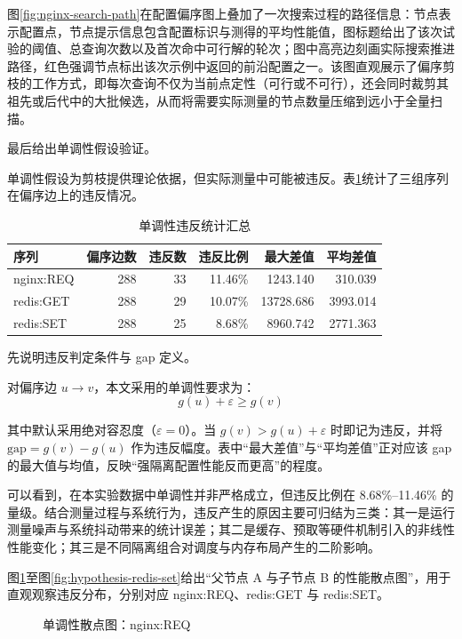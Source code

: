 \documentclass[UTF8,a4paper,12pt]{ctexart}
\numberwithin{equation}{section}
\begin{document}
图\ref{fig:nginx-search-path}在配置偏序图上叠加了一次搜索过程的路径信息：节点表示配置点，节点提示信息包含配置标识与测得的平均性能值，图标题给出了该次试验的阈值、总查询次数以及首次命中可行解的轮次；图中高亮边刻画实际搜索推进路径，红色强调节点标出该次示例中返回的前沿配置之一。该图直观展示了偏序剪枝的工作方式，即每次查询不仅为当前点定性（可行或不可行），还会同时裁剪其祖先或后代中的大批候选，从而将需要实际测量的节点数量压缩到远小于全量扫描。

最后给出单调性假设验证。

单调性假设为剪枝提供理论依据，但实际测量中可能被违反。表\ref{tab:monotonic-violation-summary}统计了三组序列在偏序边上的违反情况。

{\small
\setlength{\tabcolsep}{4pt}
\begin{longtable}{@{}lrrrrr@{}}
\caption{单调性违反统计汇总}\label{tab:monotonic-violation-summary}\\
\toprule
序列 & 偏序边数 & 违反数 & 违反比例 & 最大差值 & 平均差值 \\
\midrule
\endhead
\bottomrule
\endlastfoot
nginx:REQ & 288 & 33 & 11.46\% & 1243.140 & 310.039 \\
redis:GET & 288 & 29 & 10.07\% & 13728.686 & 3993.014 \\
redis:SET & 288 & 25 & 8.68\% & 8960.742 & 2771.363 \\
\end{longtable}
}

先说明违反判定条件与 gap 定义。

对偏序边 \(u\to v\)，本文采用的单调性要求为：
\begin{equation}
g(u) + \varepsilon \ge g(v)
\end{equation}

其中默认采用绝对容忍度（\(\varepsilon=0\)）。当
\(g(v) > g(u)+\varepsilon\) 时即记为违反，并将 \(\text{gap}=g(v)-g(u)\)
作为违反幅度。表中``最大差值''与``平均差值''正对应该 gap
的最大值与均值，反映``强隔离配置性能反而更高''的程度。

可以看到，在本实验数据中单调性并非严格成立，但违反比例在 8.68\%--11.46\%
的量级。结合测量过程与系统行为，违反产生的原因主要可归结为三类：其一是运行测量噪声与系统抖动带来的统计误差；其二是缓存、预取等硬件机制引入的非线性性能变化；其三是不同隔离组合对调度与内存布局产生的二阶影响。

图\ref{fig:hypothesis-nginx-req}至图\ref{fig:hypothesis-redis-set}给出``父节点 A 与子节点 B 的性能散点图''，用于直观观察违反分布，分别对应 nginx:REQ、redis:GET 与 redis:SET。

\begin{figure}
  \centering
  
  \caption{单调性散点图：nginx:REQ}
  \label{fig:hypothesis-nginx-req}
\end{figure}
\end{document}
